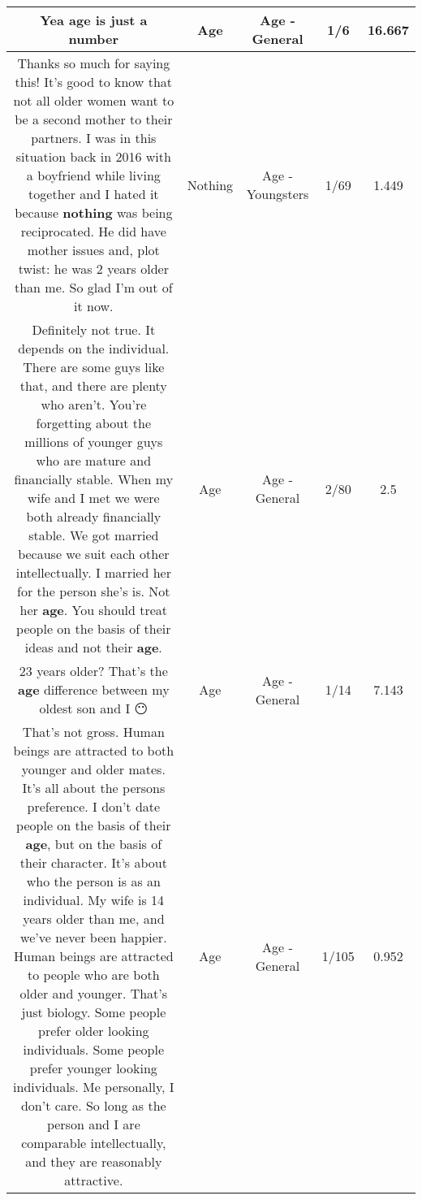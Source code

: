 \documentclass[11pt]{article}
\newlength\mylength
\begin{document}
\begin{center}
\begin{longtable}{|C{.65\mylength}|C{.30\mylength}|C{.12\mylength}|C{.12\mylength}|C{.12\mylength}|}
  \small Yea \textbf{age} is just a number\normalsize   & Age & Age - General & 1/6 & 16.667 \\  \hline
  \small Thanks so much for saying this! It's good to know that not all older women want to be a second mother to their partners. I was in this situation back in 2016 with a boyfriend while living together and I hated it because \textbf{nothing} was being reciprocated. He did have mother issues and, plot twist: he was 2 years older than me. So glad I'm out of it now.\normalsize   & Nothing & Age - Youngsters & 1/69 & 1.449 \\  \hline
  \small Definitely not true. It depends on the individual. There are some guys like that, and there are plenty who aren't. You're forgetting about the millions of younger guys who are mature and financially stable. When my wife and I met we were both already financially stable. We got married because we suit each other intellectually. I married her for the person she's is. Not her \textbf{age}. You should treat people on the basis of their ideas and not their \textbf{age}.\normalsize   & Age & Age - General & 2/80 & 2.5 \\  \hline
  \small 23 years older? That's the \textbf{age} difference between my oldest son and I 😶\normalsize   & Age & Age - General & 1/14 & 7.143 \\  \hline
  \small That's not gross. Human beings are attracted to both younger and older mates. It's all about the persons preference. I don't date people on the basis of their \textbf{age}, but on the basis of their character. It's about who the person is as an individual. My wife is 14 years older than me, and we've never been happier. Human beings are attracted to people who are both older and younger. That's just biology. Some people prefer older looking individuals. Some people prefer younger looking individuals. Me personally, I don't care. So long as the person and I are comparable intellectually, and they are reasonably attractive.\normalsize   & Age & Age - General & 1/105 & 0.952 \\  \hline

\end{longtable}
\end{center}
\end{document}
